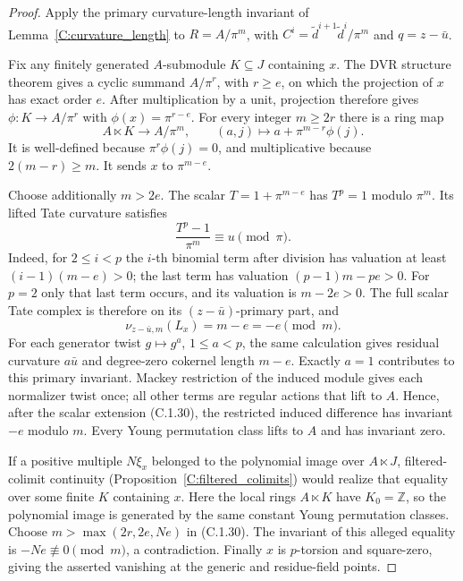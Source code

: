 \begin{proof}
Apply the primary curvature-length invariant of
Lemma~\ref{C:curvature_length} to $R=A/\pi^m$, with
$C^i=\widetilde d^{i+1}\widetilde d^i/\pi^m$ and
$q=z-\bar u$.

Fix any finitely generated $A$-submodule $K\subseteq J$ containing
$x$. The DVR structure theorem gives a cyclic summand $A/\pi^r$,
with $r\ge e$, on which the projection of $x$ has exact order $e$.
After multiplication by a unit, projection therefore gives
$\phi:K\to A/\pi^r$ with $\phi(x)=\pi^{r-e}$.
For every integer $m\ge2r$ there is a ring map
\[
 A\ltimes K\longrightarrow A/\pi^m,\qquad
 (a,j)\longmapsto a+\pi^{m-r}\phi(j).
                                                        \tag{C.1.30}
\]
It is well-defined because $\pi^r\phi(j)=0$, and multiplicative
because $2(m-r)\ge m$. It sends $x$ to $\pi^{m-e}$.

Choose additionally $m>2e$. The scalar
$T=1+\pi^{m-e}$ has $T^p=1$ modulo $\pi^m$.
Its lifted Tate curvature satisfies
\[
 \frac{T^p-1}{\pi^m}\equiv u\pmod\pi.
\]
Indeed, for $2\le i<p$ the $i$-th binomial term after division
has valuation at least $(i-1)(m-e)>0$; the last term has
valuation $(p-1)m-pe>0$. For $p=2$ only that last term occurs,
and its valuation is $m-2e>0$.
The full scalar Tate complex is therefore on its
$(z-\bar u)$-primary part, and
\[
 \nu_{z-\bar u,m}(L_x)=m-e=-e\pmod m.
\]
For each generator twist $g\mapsto g^a$, $1\le a<p$, the same
calculation gives residual curvature $a\bar u$ and degree-zero
cokernel length $m-e$. Exactly $a=1$ contributes to this primary
invariant. Mackey restriction of the induced module gives each
normalizer twist once; all other terms are regular actions that
lift to $A$. Hence, after the scalar extension (C.1.30), the
restricted induced difference has invariant $-e$ modulo $m$.
Every Young permutation class lifts to $A$ and has invariant zero.

If a positive multiple $N\xi_x$ belonged to the polynomial image
over $A\ltimes J$, filtered-colimit continuity
(Proposition~\ref{C:filtered_colimits}) would realize that equality
over some finite $K$ containing $x$. Here the local rings
$A\ltimes K$ have $K_0=\mathbb Z$, so the polynomial image is
generated by the same constant Young permutation classes.
Choose $m>\max(2r,2e,Ne)$ in (C.1.30). The invariant of this
alleged equality is $-Ne\not\equiv0\pmod m$, a contradiction.
Finally $x$ is $p$-torsion and square-zero, giving the asserted
vanishing at the generic and residue-field points.
\end{proof}

